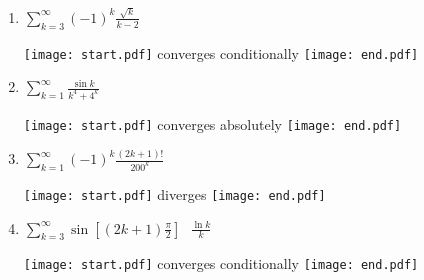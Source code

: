 \documentclass[12pt]{article}
\begin{document}
\begin{enumerate}
\item $\sum_{k=3}^{\infty}{(-1)^k \frac{\sqrt{k}}{k-2} }$

\texttt{[image: start.pdf]}
{{converges conditionally}}
\texttt{[image: end.pdf]}


\item $\sum_{k=1}^{\infty}{\frac{\sin{k}}{k^4+4^k} }$

\texttt{[image: start.pdf]}
{{converges absolutely}}
\texttt{[image: end.pdf]}


\item $\sum_{k=1}^{\infty}{(-1)^k \frac{(2k+1)!}{200^k} }$

\texttt{[image: start.pdf]}
{{diverges}}
\texttt{[image: end.pdf]}


\item $\sum_{k=3}^{\infty}{\sin\left[(2k+1)\frac{\pi}{2}\right] \text{ } \frac{\ln{k}}{k} }$

\texttt{[image: start.pdf]}
{{converges conditionally}}
\texttt{[image: end.pdf]}


\end{enumerate}

\end{document}
